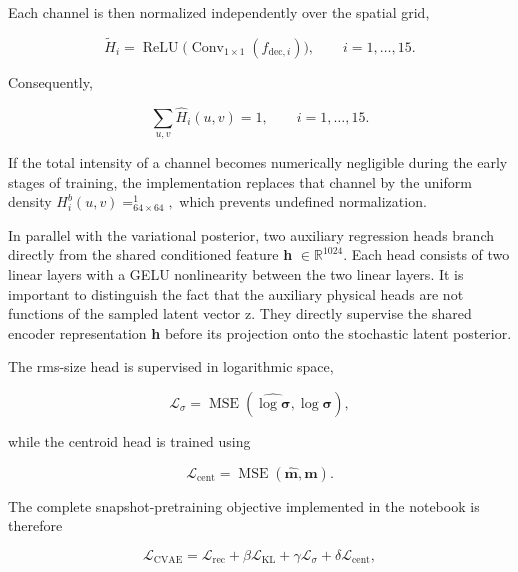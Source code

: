 Each channel is then normalized independently over the spatial grid,

\begin{equation}
\label{eq:145}
\widetilde H_i=\operatorname{ReLU}\bigl(\operatorname{Conv}_{1\times1}(f_{\mathrm{dec},i})\bigr),\qquad i=1,\ldots,15.
\end{equation}

Consequently,

\begin{equation}
\label{eq:146}
\sum_{u,v}\widehat H_i(u,v)=1,\qquad i=1,\ldots,15.
\end{equation}

If the total intensity of a channel becomes numerically negligible during the early stages of training, the implementation replaces that channel by the uniform density \(H_{i}^{b} ( u , v ) =_{64 \times 64}^{1} ,\) which prevents undefined normalization.

In parallel with the variational posterior, two auxiliary regression heads branch directly from the shared conditioned feature \textbf{h} \(\in \mathbb{R}^{1024} .\) Each head consists of two linear layers with a GELU nonlinearity between the two linear layers. It is important to distinguish the fact that the auxiliary physical heads are not functions of the sampled latent vector z. They directly supervise the shared encoder representation \textbf{h} before its projection onto the stochastic latent posterior.

The rms-size head is supervised in logarithmic space,

\begin{equation}
\label{eq:147}
\mathcal L_{\sigma}=\operatorname{MSE}(\widehat{\log\boldsymbol\sigma},\log\boldsymbol\sigma),
\end{equation}

while the centroid head is trained using

\begin{equation}
\label{eq:148}
\mathcal L_{\mathrm{cent}}=\operatorname{MSE}(\widehat{\mathbf m},\mathbf m).
\end{equation}

The complete snapshot-pretraining objective implemented in the notebook is therefore

\begin{equation}
\label{eq:149}
\mathcal L_{\mathrm{CVAE}}=\mathcal L_{\mathrm{rec}}+\beta\mathcal L_{\mathrm{KL}}+\gamma\mathcal L_{\sigma}+\delta\mathcal L_{\mathrm{cent}},
\end{equation}

